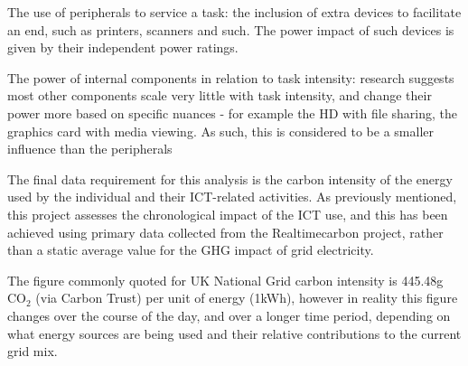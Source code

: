 \documentclass[conference]{IEEEtran}
\begin{document}
\begin{compactitem}
\item The use of peripherals to service a task: the inclusion of extra
devices to facilitate an end, such as printers, scanners and such. The
power impact of such devices is given by their independent power
ratings.

\item The power of internal components in relation to task intensity:
  research suggests most other components scale very little with task
intensity, and change their power more based on specific nuances - for
example the HD with file sharing, the graphics card with media
viewing. As such, this is considered to be a smaller influence than
the peripherals
\end{compactitem}





The final data requirement for this analysis is the carbon intensity
of the energy used by the individual and their ICT-related
activities. As previously mentioned, this project assesses the
chronological impact of the ICT use, and this has been achieved using
primary data collected from the Realtimecarbon project, rather than a
static average value for the GHG impact of grid electricity.

The figure commonly quoted for UK National Grid carbon intensity is
445.48g CO$_2$ (via Carbon Trust) per unit of energy (1kWh), however
in reality this figure changes over the course of the day, and over a
longer time period, depending on what energy sources are being used
and their relative contributions to the current grid mix.
\end{document}
